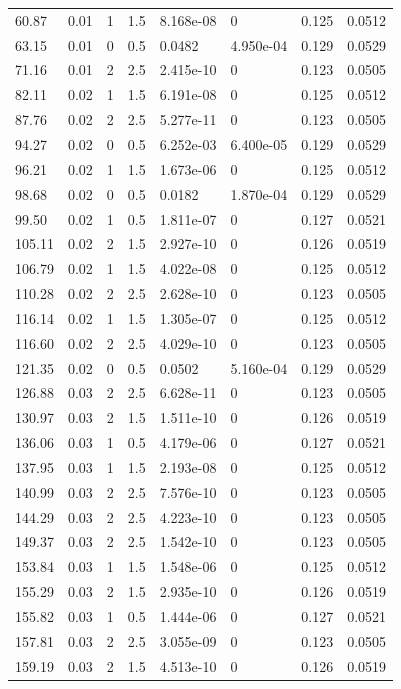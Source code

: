 \documentclass[preview]{standalone}
\begin{document}
{{\begin{tabular}{L{1.2cm}C{1.2cm} C{0.3cm}C{0.5cm} C{1.4cm}C{1.4cm} C{1.4cm}C{1.4cm}}
  60.87  &  0.01  & 1     & 1.5 &  8.168e-08  & 0  & 0.125 &  0.0512   \\ 
  63.15  &  0.01  & 0     & 0.5 &  0.0482  & 4.950e-04  & 0.129 &  0.0529   \\ 
  71.16  &  0.01  & 2     & 2.5 &  2.415e-10  & 0  & 0.123 &  0.0505   \\ 
  82.11  &  0.02  & 1     & 1.5 &  6.191e-08  & 0  & 0.125 &  0.0512   \\ 
  87.76  &  0.02  & 2     & 2.5 &  5.277e-11  & 0  & 0.123 &  0.0505   \\ 
  94.27  &  0.02  & 0     & 0.5 &  6.252e-03  & 6.400e-05  & 0.129 &  0.0529   \\ 
  96.21  &  0.02  & 1     & 1.5 &  1.673e-06  & 0  & 0.125 &  0.0512   \\ 
  98.68  &  0.02  & 0     & 0.5 &  0.0182  & 1.870e-04  & 0.129 &  0.0529   \\ 
  99.50  &  0.02  & 1     & 0.5 &  1.811e-07  & 0  & 0.127 &  0.0521   \\ 
  105.11  &  0.02  & 2     & 1.5 &  2.927e-10  & 0  & 0.126 &  0.0519   \\ 
  106.79  &  0.02  & 1     & 1.5 &  4.022e-08  & 0  & 0.125 &  0.0512   \\ 
  110.28  &  0.02  & 2     & 2.5 &  2.628e-10  & 0  & 0.123 &  0.0505   \\ 
  116.14  &  0.02  & 1     & 1.5 &  1.305e-07  & 0  & 0.125 &  0.0512   \\ 
  116.60  &  0.02  & 2     & 2.5 &  4.029e-10  & 0  & 0.123 &  0.0505   \\ 
  121.35  &  0.02  & 0     & 0.5 &  0.0502  & 5.160e-04  & 0.129 &  0.0529   \\ 
  126.88  &  0.03  & 2     & 2.5 &  6.628e-11  & 0  & 0.123 &  0.0505   \\ 
  130.97  &  0.03  & 2     & 1.5 &  1.511e-10  & 0  & 0.126 &  0.0519   \\ 
  136.06  &  0.03  & 1     & 0.5 &  4.179e-06  & 0  & 0.127 &  0.0521   \\ 
  137.95  &  0.03  & 1     & 1.5 &  2.193e-08  & 0  & 0.125 &  0.0512   \\ 
  140.99  &  0.03  & 2     & 2.5 &  7.576e-10  & 0  & 0.123 &  0.0505   \\ 
  144.29  &  0.03  & 2     & 2.5 &  4.223e-10  & 0  & 0.123 &  0.0505   \\ 
  149.37  &  0.03  & 2     & 2.5 &  1.542e-10  & 0  & 0.123 &  0.0505   \\ 
  153.84  &  0.03  & 1     & 1.5 &  1.548e-06  & 0  & 0.125 &  0.0512   \\ 
  155.29  &  0.03  & 2     & 1.5 &  2.935e-10  & 0  & 0.126 &  0.0519   \\ 
  155.82  &  0.03  & 1     & 0.5 &  1.444e-06  & 0  & 0.127 &  0.0521   \\ 
  157.81  &  0.03  & 2     & 2.5 &  3.055e-09  & 0  & 0.123 &  0.0505   \\ 
  159.19  &  0.03  & 2     & 1.5 &  4.513e-10  & 0  & 0.126 &  0.0519   \\ 
\hline 
\end{tabular} 

}}
\end{document}
